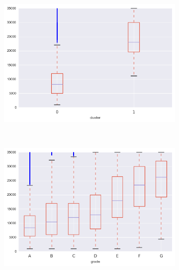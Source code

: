 \begin{apendicesenv}
\begin{figure}[t!]
\begin{subfigure}[t]{0.5\textwidth}
			\centerline{\includegraphics[width=1.05\textwidth]{img/loan_amnt_by_cluster}}
    	\end{subfigure}%
    	~ 
    	\begin{subfigure}[t]{0.5\textwidth}
    		\centering
   
			\centerline{\includegraphics[width=1.05\textwidth]{img/loan_amnt_by_grade}}

    	\end{subfigure}
\\
    	        \caption{int\textunderscore rate\textunderscore float}
    	\begin{subfigure}[t]{0.5\textwidth}
    		\centering


\end{subfigure}
\end{figure}
\end{apendicesenv}

